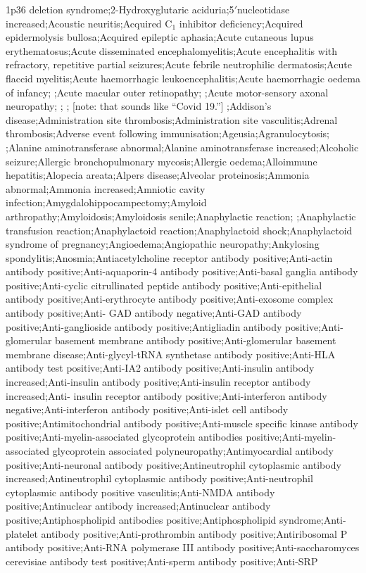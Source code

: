 \begin{refsection}
\begin{tcolorbox}[quote]
1p36 deletion syndrome;2-Hydroxyglutaric aciduria;5$\prime$nucleotidase increased;Acoustic neuritis;Acquired C$_{1}$ inhibitor deficiency;Acquired epidermolysis bullosa;Acquired epileptic aphasia;Acute cutaneous lupus erythematosus;Acute disseminated encephalomyelitis;Acute encephalitis with refractory, repetitive partial seizures;Acute febrile neutrophilic dermatosis;Acute flaccid myelitis;Acute haemorrhagic leukoencephalitis;Acute haemorrhagic oedema of infancy; ;Acute macular outer retinopathy; ;Acute motor-sensory axonal neuropathy; ; ; [note: that sounds like \enquote{Covid 19.}] ;Addison's disease;Administration site thrombosis;Administration site vasculitis;Adrenal thrombosis;Adverse event following immunisation;Ageusia;Agranulocytosis; ;Alanine aminotransferase abnormal;Alanine aminotransferase increased;Alcoholic seizure;Allergic bronchopulmonary mycosis;Allergic oedema;Alloimmune hepatitis;Alopecia areata;Alpers disease;Alveolar proteinosis;Ammonia abnormal;Ammonia increased;Amniotic cavity infection;Amygdalohippocampectomy;Amyloid arthropathy;Amyloidosis;Amyloidosis senile;Anaphylactic reaction; ;Anaphylactic transfusion reaction;Anaphylactoid reaction;Anaphylactoid shock;Anaphylactoid syndrome of pregnancy;Angioedema;Angiopathic neuropathy;Ankylosing spondylitis;Anosmia;Antiacetylcholine receptor antibody positive;Anti-actin antibody positive;Anti-aquaporin-4 antibody positive;Anti-basal ganglia antibody positive;Anti-cyclic citrullinated peptide antibody positive;Anti-epithelial antibody positive;Anti-erythrocyte antibody positive;Anti-exosome complex antibody positive;Anti- GAD antibody negative;Anti-GAD antibody positive;Anti-ganglioside antibody positive;Antigliadin antibody positive;Anti-glomerular basement membrane antibody positive;Anti-glomerular basement membrane disease;Anti-glycyl-tRNA synthetase antibody positive;Anti-HLA antibody test positive;Anti-IA2 antibody positive;Anti-insulin antibody increased;Anti-insulin antibody positive;Anti-insulin receptor antibody increased;Anti- insulin receptor antibody positive;Anti-interferon antibody negative;Anti-interferon antibody positive;Anti-islet cell antibody positive;Antimitochondrial antibody positive;Anti-muscle specific kinase antibody positive;Anti-myelin-associated glycoprotein antibodies positive;Anti-myelin-associated glycoprotein associated polyneuropathy;Antimyocardial antibody positive;Anti-neuronal antibody positive;Antineutrophil cytoplasmic antibody increased;Antineutrophil cytoplasmic antibody positive;Anti-neutrophil cytoplasmic antibody positive vasculitis;Anti-NMDA antibody positive;Antinuclear antibody increased;Antinuclear antibody positive;Antiphospholipid antibodies positive;Antiphospholipid syndrome;Anti-platelet antibody positive;Anti-prothrombin antibody positive;Antiribosomal P antibody positive;Anti-RNA polymerase III antibody positive;Anti-saccharomyces cerevisiae antibody test positive;Anti-sperm antibody positive;Anti-SRP 
\end{tcolorbox}
\end{refsection}
